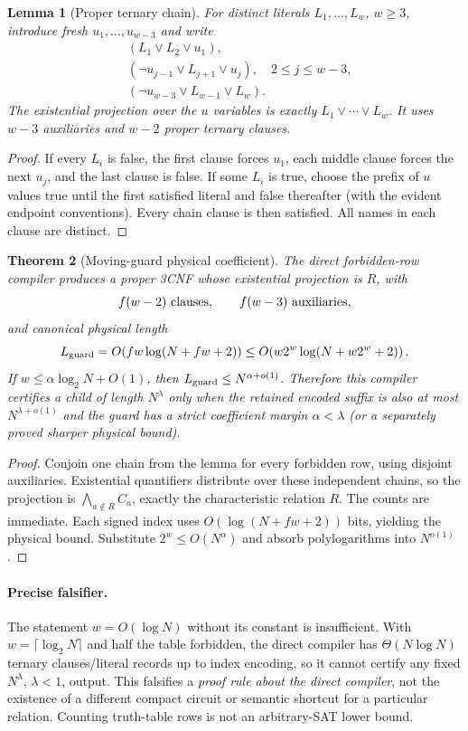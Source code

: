 \documentclass[11pt]{article}
\newtheorem{theorem}{Theorem}
\newtheorem{lemma}[theorem]{Lemma}
\begin{document}
\begin{lemma}[Proper ternary chain]
For distinct literals $L_1,\ldots,L_w$, $w\ge3$, introduce fresh
$u_1,\ldots,u_{w-3}$ and write
\begin{align*}
 &(L_1\vee L_2\vee u_1),\\
 &(\neg u_{j-1}\vee L_{j+1}\vee u_j),\quad 2\le j\le w-3,\\
 &(\neg u_{w-3}\vee L_{w-1}\vee L_w).
\end{align*}
The existential projection over the $u$ variables is exactly
$L_1\vee\cdots\vee L_w$.  It uses $w-3$ auxiliaries and $w-2$ proper
ternary clauses.
\end{lemma}
\begin{proof}
If every $L_i$ is false, the first clause forces $u_1$, each middle clause
forces the next $u_j$, and the last clause is false.  If some $L_i$ is true,
choose the prefix of $u$ values true until the first satisfied literal and
false thereafter (with the evident endpoint conventions).  Every chain
clause is then satisfied.  All names in each clause are distinct.
\end{proof}

\begin{theorem}[Moving-guard physical coefficient]
The direct forbidden-row compiler produces a proper 3CNF whose existential
projection is $R$, with
\[
 f(w-2)\ \hbox{clauses},\qquad f(w-3)\ \hbox{auxiliaries},
\]
and canonical physical length
\[
 L_{\rm guard}=O\!\left(fw\log(N+fw+2)\right)
 \le O\!\left(w2^w\log(N+w2^w+2)\right).
\]
If $w\le\alpha\log_2N+O(1)$, then
$L_{\rm guard}\le N^{\alpha+o(1)}$.  Therefore this compiler certifies a
child of length $N^\lambda$ only when the retained encoded suffix is also at
most $N^{\lambda+o(1)}$ and the guard has a strict coefficient margin
$\alpha<\lambda$ (or a separately proved sharper physical bound).
\end{theorem}
\begin{proof}
Conjoin one chain from the lemma for every forbidden row, using disjoint
auxiliaries.  Existential quantifiers distribute over these independent
chains, so the projection is $\bigwedge_{a\notin R}C_a$, exactly the
characteristic relation $R$.  The counts are immediate.  Each signed index
uses $O(\log(N+fw+2))$ bits, yielding the physical bound.  Substitute
$2^w\le O(N^\alpha)$ and absorb polylogarithms into $N^{o(1)}$.
\end{proof}

\paragraph{Precise falsifier.}
The statement $w=O(\log N)$ without its constant is insufficient.  With
$w=\lceil\log_2N\rceil$ and half the table forbidden, the direct compiler has
$\Theta(N\log N)$ ternary clauses/literal records up to index encoding, so it
cannot certify any fixed $N^\lambda$, $\lambda<1$, output.  This falsifies a
\emph{proof rule about the direct compiler}, not the existence of a different
compact circuit or semantic shortcut for a particular relation.  Counting
truth-table rows is not an arbitrary-SAT lower bound.
\end{document}
